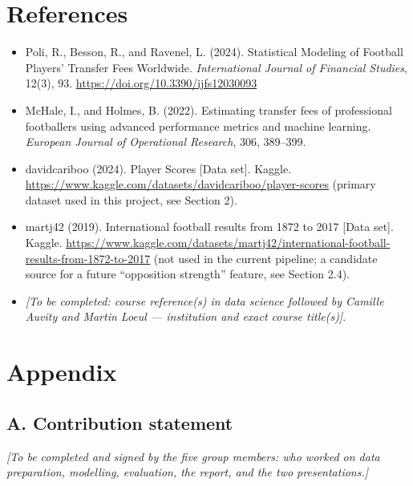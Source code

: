 \documentclass[11pt]{article}
\begin{document}
\section*{References}
\begin{itemize}[leftmargin=1.4em]
    \item Poli, R., Besson, R., and Ravenel, L. (2024). Statistical Modeling
    of Football Players' Transfer Fees Worldwide. \textit{International
    Journal of Financial Studies}, 12(3), 93.
    \url{https://doi.org/10.3390/ijfs12030093}
    \item McHale, I., and Holmes, B. (2022). Estimating transfer fees of
    professional footballers using advanced performance metrics and machine
    learning. \textit{European Journal of Operational Research}, 306,
    389--399.
    \item davidcariboo (2024). Player Scores [Data set]. Kaggle.
    \url{https://www.kaggle.com/datasets/davidcariboo/player-scores}
    (primary dataset used in this project, see Section 2).
    \item martj42 (2019). International football results from 1872 to 2017
    [Data set]. Kaggle.
    \url{https://www.kaggle.com/datasets/martj42/international-football-results-from-1872-to-2017}
    (not used in the current pipeline; a candidate source for a future
    ``opposition strength'' feature, see Section 2.4).
    \item \textit{[To be completed: course reference(s) in data science
    followed by Camille Auvity and Martin Loeul --- institution and exact
    course title(s)]}.
\end{itemize}

\clearpage
\appendix
\section*{Appendix}

\subsection*{A. Contribution statement}
\textit{[To be completed and signed by the five group members: who worked on
data preparation, modelling, evaluation, the report, and the two
presentations.]}
\end{document}
